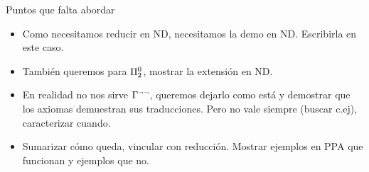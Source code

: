 
Puntos que falta abordar
\begin{itemize}
    \item Como necesitamos reducir en ND, necesitamos la demo en ND. Escribirla
    en este caso.
    \item También queremos para $\Pi^0_2$, mostrar la extensión en ND.
    \item En realidad no nos sirve $\Gamma^{\neg\neg}$, queremos dejarlo como
    está y demostrar que los axiomas demuestran sus traducciones. Pero no vale
    siempre (buscar c.ej), caracterizar cuando.
    \item Sumarizar cómo queda, vincular con reducción. Mostrar ejemplos en PPA
    que funcionan y ejemplos que no.
\end{itemize}
